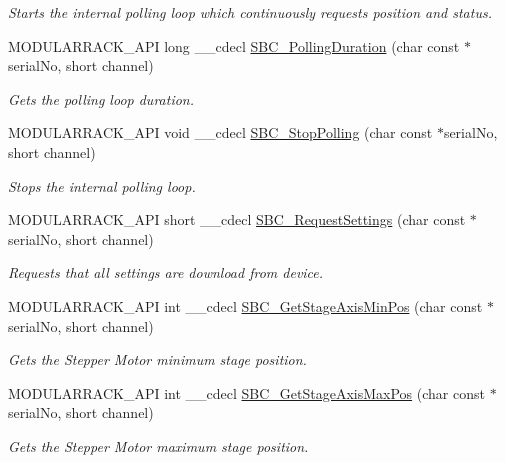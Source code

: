 \begin{DoxyCompactItemize}
\begin{DoxyCompactList}\small\item\em Starts the internal polling loop which continuously requests position and status. \end{DoxyCompactList}\item 
M\+O\+D\+U\+L\+A\+R\+R\+A\+C\+K\+\_\+\+A\+PI long \+\_\+\+\_\+cdecl \hyperlink{group___modular_stepper_gafd76c37222de1b2286b5a78faf944dee}{S\+B\+C\+\_\+\+Polling\+Duration} (char const $\ast$serial\+No, short channel)
\begin{DoxyCompactList}\small\item\em Gets the polling loop duration. \end{DoxyCompactList}\item 
M\+O\+D\+U\+L\+A\+R\+R\+A\+C\+K\+\_\+\+A\+PI void \+\_\+\+\_\+cdecl \hyperlink{group___modular_stepper_ga3e718a21115e626e0426ccd1b1c638f8}{S\+B\+C\+\_\+\+Stop\+Polling} (char const $\ast$serial\+No, short channel)
\begin{DoxyCompactList}\small\item\em Stops the internal polling loop. \end{DoxyCompactList}\item 
M\+O\+D\+U\+L\+A\+R\+R\+A\+C\+K\+\_\+\+A\+PI short \+\_\+\+\_\+cdecl \hyperlink{group___modular_stepper_gad208d22caee53ecdd7e8cd7df5783aeb}{S\+B\+C\+\_\+\+Request\+Settings} (char const $\ast$serial\+No, short channel)
\begin{DoxyCompactList}\small\item\em Requests that all settings are download from device. \end{DoxyCompactList}\item 
M\+O\+D\+U\+L\+A\+R\+R\+A\+C\+K\+\_\+\+A\+PI int \+\_\+\+\_\+cdecl \hyperlink{group___modular_stepper_ga5ac630335d2eb10ed77511f2c55abb0f}{S\+B\+C\+\_\+\+Get\+Stage\+Axis\+Min\+Pos} (char const $\ast$serial\+No, short channel)
\begin{DoxyCompactList}\small\item\em Gets the Stepper Motor minimum stage position. \end{DoxyCompactList}\item 
M\+O\+D\+U\+L\+A\+R\+R\+A\+C\+K\+\_\+\+A\+PI int \+\_\+\+\_\+cdecl \hyperlink{group___modular_stepper_ga29d43cd69ef6f75e7cdec9142693f2dd}{S\+B\+C\+\_\+\+Get\+Stage\+Axis\+Max\+Pos} (char const $\ast$serial\+No, short channel)
\begin{DoxyCompactList}\small\item\em Gets the Stepper Motor maximum stage position. \end{DoxyCompactList}\item 

\end{DoxyCompactItemize}
